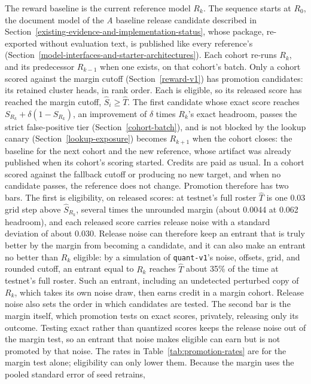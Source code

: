 The reward baseline is the current reference model \(R_k\). The sequence
starts at \(R_0\), the document model of the \textit{A} baseline release
candidate described in Section~\ref{existing-evidence-and-implementation-status},
whose package, re-exported without evaluation text, is published like every
reference's (Section~\ref{model-interfaces-and-starter-architectures}). Each cohort re-runs
\(R_k\), and its predecessor \(R_{k-1}\) when one exists, on that cohort's batch.
Only a cohort scored against the margin cutoff (Section~\ref{reward-v1}) has
promotion candidates: its retained cluster heads, in rank order. Each is
eligible, so its released score has reached the margin cutoff,
\(\hat S_i\geq\hat T\). The first candidate whose exact score reaches
\(S_{R_k}+\delta(1-S_{R_k})\), an improvement of \(\delta\) times \(R_k\)'s
exact headroom, passes the strict false-positive tier
(Section~\ref{cohort-batch}), and is not blocked by the lookup canary
(Section~\ref{lookup-exposure}) becomes \(R_{k+1}\) when the cohort closes: the
baseline for the next cohort and the new reference, whose artifact was already
published when its cohort's scoring started. Credits are paid as usual. In a
cohort scored against the fallback cutoff or producing no new target, and when
no candidate passes, the reference does not change.
Promotion therefore has two bars. The first is eligibility, on released scores:
at testnet's full roster \(\hat T\) is one 0.03 grid step above
\(\hat S_{R_k}\), several times the unrounded margin (about 0.0044 at 0.062
headroom), and each released score carries release noise with a standard
deviation of about 0.030. Release noise can therefore keep an entrant that is
truly better by the margin from becoming a candidate, and it can also make an
entrant no better than \(R_k\) eligible: by a simulation of \texttt{quant-v1}'s
noise, offsets, grid, and rounded cutoff, an entrant equal to \(R_k\) reaches
\(\hat T\) about 35\% of the time at testnet's full roster. Such an entrant,
including an undetected perturbed copy of \(R_k\), which takes its own noise
draw, then earns credit in a margin cohort. Release noise also sets the order in
which candidates are tested. The second bar is the margin itself, which
promotion tests on exact scores, privately, releasing only its outcome. Testing
exact rather than quantized scores keeps the release noise out of the margin
test, so an entrant that noise makes eligible can earn but is not promoted by
that noise. The rates in
Table~\ref{tab:promotion-rates} are for the margin test alone; eligibility can
only lower them. Because the margin uses the pooled standard error of seed retrains,
